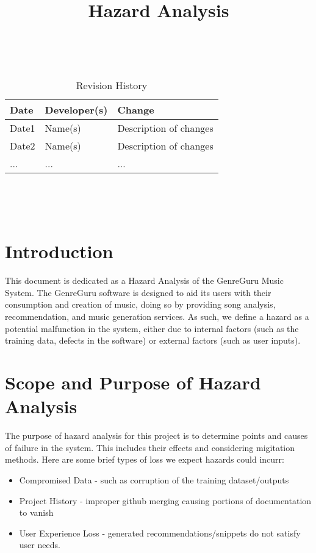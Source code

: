 \documentclass{article}
\title{Hazard Analysis\\\progname}
\author{\authname}
\date{}
\begin{document}
\maketitle
\thispagestyle{empty}

~\newpage


\begin{table}[hp]
\caption{Revision History} \label{TblRevisionHistory}
\begin{tabularx}{\textwidth}{llX}
\toprule
\textbf{Date} & \textbf{Developer(s)} & \textbf{Change}\\
\midrule
Date1 & Name(s) & Description of changes\\
Date2 & Name(s) & Description of changes\\
... & ... & ...\\
\bottomrule
\end{tabularx}
\end{table}

~\newpage

\tableofcontents

~\newpage



\section{Introduction}


This document is dedicated as a Hazard Analysis of the GenreGuru Music System. The GenreGuru software is designed
to aid its users with their consumption and creation of music, doing so by providing song analysis, recommendation,
and music generation services. As such, we define a hazard as a potential malfunction in the system, either due to internal
factors (such as the training data, defects in the software) or external factors (such as user inputs).  

\section{Scope and Purpose of Hazard Analysis}


The purpose of hazard analysis for this project is to determine points and causes of failure in the system. This 
includes their effects and considering migitation methods. Here are some brief types of loss we expect hazards could 
incurr: 
\begin{itemize}
    \item Compromised Data - such as corruption of the training dataset/outputs
    \item Project History - improper github merging causing portions of documentation to vanish
    \item User Experience Loss - generated recommendations/snippets do not satisfy user needs. 
\end{itemize}
\end{document}
